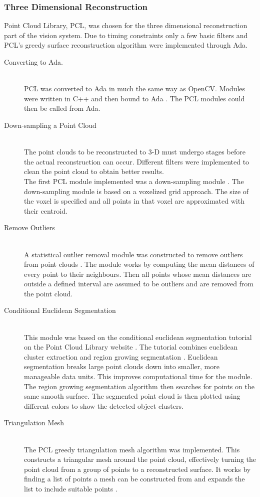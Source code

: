 \subsubsection{Three Dimensional Reconstruction} 
Point Cloud Library, PCL, was chosen for the three dimensional reconstruction part of the vision system. Due to timing constraints only a few basic filters and PCL's greedy surface reconstruction algorithm were implemented through Ada.
\begin{description}
\item[Converting to Ada.]\hfill \\
PCL was converted to Ada in much the same way as OpenCV. Modules were written in C++ and then bound to Ada \cite{web:newAdaBindings}. The PCL modules could then be called from Ada.

\item[Down-sampling a Point Cloud]\hfill \\
The point clouds to be reconstructed to 3-D must undergo stages before the actual reconstruction can occur. Different filters were implemented to clean the point cloud to obtain better results.
\\The first PCL module implemented was a down-sampling module \cite{web:pclVoxel} . The down-sampling module is based on a voxelized grid approach. The size of the voxel is specified and all points in that voxel are approximated with their centroid.	

\item[Remove Outliers]\hfill \\
A statistical outlier removal module was constructed to remove outliers from point clouds \cite{web:pclOutliers}. The module works by computing the mean distances of every point to their neighbours. Then all points whose mean distances are outside a defined interval are assumed to be outliers and are removed from the point cloud.

\item[Conditional Euclidean Segmentation]\hfill \\
This module was based on the conditional euclidean segmentation tutorial on the Point Cloud Library website \cite{web:PCL}. The tutorial combines euclidean cluster extraction \cite{RusuDoctoralDissertation} and region growing segmentation \cite{web:pclRegionGrowing}. Euclidean segmentation breaks large point clouds down into smaller, more manageable data units. This improves computational time for the module. The region growing segmentation algorithm then searches for points on the same smooth surface. The segmented point cloud is then plotted using different colors to show the detected object clusters.

\item[Triangulation Mesh]\hfill \\
The PCL greedy triangulation mesh algorithm was implemented. This constructs a triangular mesh around the point cloud, effectively turning the point cloud from a group of points to a reconstructed surface. It works by finding a list of points a mesh can be constructed from and expands the list to include suitable points \cite{Marton09ICRA}. 
 
\end{description}